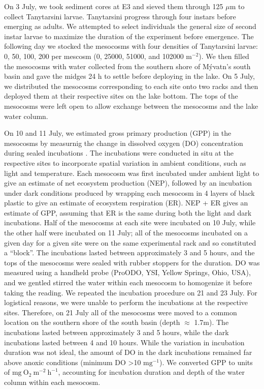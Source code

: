 On 3 July, 
we took sediment cores at E3 and sieved them through 125 $\mu \text{m}$
to collect Tanytarsini larvae.
Tanytarsini progress through four instars before emerging as adults.
We attempted to select individuals the general size of second instar larvae
to maximize the duration of the experiment before emergence.
The following day we stocked the mesocosms with four densities of Tanytarsini larvae:
0, 50, 100, 200 per mescosm (0, 25000, 51000, and 102000 $\text{m}^{-2}$). 
We then filled the mesocosms with water collected from the southern shore of M\'{y}vatn's
south basin and gave the midges 24 h to settle before deploying in the lake.
On 5 July, 
we distributed the mesocosms corresponding to each site onto two racks and then
deployed them at their respective sites on the lake bottom.
The tops of the mesocosms were left open to allow exchange between the mesocosms
and the lake water column.

On 10 and 11 July, 
we estimated gross primary production (GPP) in the mesocosms by measurnig the change in
dissolved oxygen (DO) concentration during sealed incubations \citep{hall2017}.
The incubations were conducted in situ at the respective sites to incorporate
spatial variation in ambient conditions, such as light and temperature.
Each mesocosm was first incubated under ambient light to give an
estimate of net ecosystem production (NEP),
followed by an incubation under dark conditions produced by wrapping each mesocosm 
in 4 layers of black plastic to give an estimate of ecosystem respiration (ER).
NEP + ER gives an estimate of GPP, assuming that ER is the same during both the light
and dark incubations. Half of the mesocosms at each site were incubated on 10 July,
while the other half were incubated on 11 July;
all of the mesocosms incubated on a given day for a given site were on the same 
experimental rack and so constituted a ``block''.
The incubations lasted between approximately 3 and 5 hours, 
and the tops of the mesocosms were sealed with rubber stoppers for the duration.
DO was measured using a handheld probe (ProODO, YSI, Yellow Springs, Ohio, USA),
and we gentled stirred the water within each mesocosm to homogenize it 
before taking the reading. 
We repeated the incubation procedure on 21 and 23 July.
For logistical reasons, we were unable to perform the incubations at the respective sites.
Therefore, on 21 July all of the mesocosms were moved to a common location on the
southern shore of the south basin (depth $\approx$ 1.7m).
The incubations lasted between approximately 3 and 5 hours,
while the dark incubations lasted between 4 and 10 hours.
While the variation in incubation duration was not ideal,
the amount of DO in the dark incubations remained far above anoxic conditions 
(minimum DO >10 $\text{mg}^{-1}$). 
We converted GPP to units of $\text{mg}~\text{O}_2~\text{m}^{-2}~\text{h}^{-1}$,
accounting for incubation duration and depth of the water column within each mesocosm.

